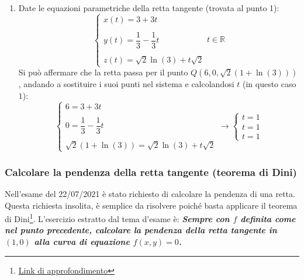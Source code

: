 \documentclass[a4paper]{article}
\begin{document}
\begin{itemize}
\begin{enumerate}
			\item Date le equazioni parametriche della retta tangente (trovata al punto 1):
			\begin{equation*}
				\begin{cases}
					x\left(t\right) = 3 + 3t \\
					\\
					y\left(t\right) = \dfrac{1}{3} - \dfrac{1}{3}t \\
					\\
					z\left(t\right) = \sqrt{2}\ln\left(3\right) + t\sqrt{2}
				\end{cases}
				t \in \mathbb{R}
			\end{equation*}
			Si può affermare che la retta passa per il punto $Q\left(6,0,\sqrt{2}\left(1+\ln\left(3\right)\right)\right)$, andando a sostituire i suoi punti nel sistema e calcolandosi $t$ (in questo caso $1$):
			\begin{equation*}
				\begin{cases}
					6 = 3 + 3t \\
					\\
					0 = \dfrac{1}{3} - \dfrac{1}{3}t \\
					\\
					\sqrt{2}\left(1+\ln\left(3\right)\right) = \sqrt{2}\ln\left(3\right) + t\sqrt{2}
				\end{cases}
				\longrightarrow
				\begin{cases}
					t = 1 \\
					t = 1 \\
					t = 1
				\end{cases}
			\end{equation*}
		\end{enumerate}
	\end{itemize}\newpage

	\subsubsection{Calcolare la pendenza della retta tangente (teorema di Dini)}

	Nell'esame del 22/07/2021 è stato richiesto di calcolare la pendenza di una retta. Questa richiesta insolita, è semplice da risolvere poiché basta applicare il teorema di Dini\footnote{\href{https://www.youmath.it/domande-a-risposte/view/1838-teorema-di-dini-help-me.html}{Link di approfondimento}}. L'esercizio estratto dal tema d'esame è: \textcolor{Green4}{\textbf{\emph{Sempre con $f$ definita come nel punto precedente, calcolare la pendenza della retta tangente in $\left(1,0\right)$ alla curva di equazione $f\left(x,y\right) = 0$.}}}\newline
\end{document}

